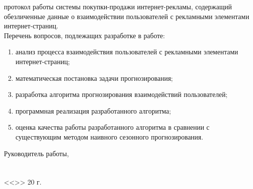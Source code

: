протокол работы системы покупки-продажи интернет-рекламы, содержащий обезличенные данные о взаимодействии пользователей с
рекламными элементами интернет-страниц.\\
Перечень вопросов, подлежащих разработке в работе: 
\begin{enumerate}
    \item анализ процесса взаимодействия пользователей с рекламными элементами интернет-страниц;
    \item математическая постановка задачи прогнозирования;
    \item разработка алгоритма прогнозирования взаимодействий пользователей;
    \item программная реализация разработанного алгоритма;
    \item оценка качества работы разработанного алгоритма в сравнении с существующим 
    методом наивного сезонного прогнозирования.
\end{enumerate}
\singlespacing{}
Руководитель работы,\\
\vspace{14pt}\\
\vspace{14pt}\\
<<\underline{\hspace{0.75cm}}>> \underline{\hspace{4.13cm}} 20\underline{\hspace{0.75cm}} г.